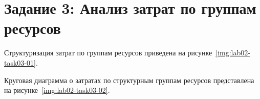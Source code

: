 \section{Задание 3: Анализ затрат по группам ресурсов}

Структуризация затрат по группам ресурсов приведена на рисунке~\ref{img:lab02-task03-01}.


Круговая диаграмма о затратах по структурным группам ресурсов представлена на рисунке~\ref{img:lab02-task03-02}.

